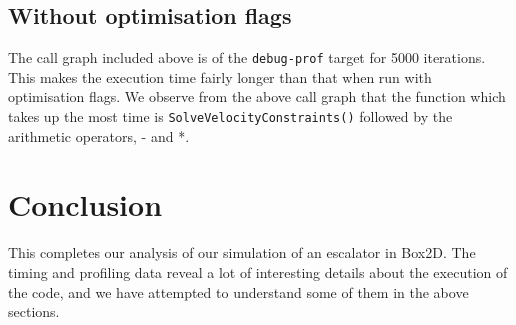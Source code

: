 \documentclass[11pt]{article}
\begin{document}
	\subsection{Without optimisation flags}
	The call graph included above is of the \texttt{debug-prof} target for 5000 iterations. This makes the execution time fairly longer than that when run with optimisation flags. We observe from the above call graph that the function which takes up the most time is \texttt{SolveVelocityConstraints()} followed by the arithmetic operators, - and *.

\section{Conclusion}

	This completes our analysis of our simulation of an escalator in Box2D. The timing and profiling data reveal a lot of interesting details about the execution of the code, and we have attempted to understand some of them in the above sections.
	
\end{document}
